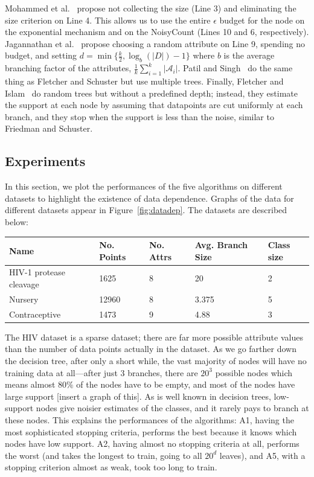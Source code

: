 \documentclass[11pt]{report}
\begin{document}
Mohammed et al.~\cite{Mohammed:2015} propose not collecting the size (Line 3) and eliminating the size criterion on Line 4. This allows us to use the entire $\epsilon$ budget for the node on the exponential mechanism and on the NoisyCount (Lines 10 and 6, respectively). Jagannathan et al.~\cite{Jagannathan:2009} propose choosing a random attribute on Line 9, spending no budget, and setting $d = \min\{\frac{k}{2}, \log_b(|D|)-1\}$ where $b$ is the average branching factor of the attributes, $\frac{1}{k}\sum_{i=1}^k |\mathcal{A}_i|$. Patil and Singh~\cite{Singh:2014} do the same thing as Fletcher and Schuster but use multiple trees. Finally, Fletcher and Islam~\cite{Fletcher:2015} do random trees but without a predefined depth; instead, they estimate the support at each node by assuming that datapoints are cut uniformly at each branch, and they stop when the support is less than the noise, similar to Friedman and Schuster.

\subsection{Experiments}
In this section, we plot the performances of the five algorithms on different datasets to highlight the existence of data dependence. Graphs of the data for different datasets appear in Figure~\ref{fig:datadep}. The datasets are described below:
\begin{tabular}{|p{3cm}|l|l|l|l|}
\hline
Name & No. Points & No. Attrs & Avg. Branch Size & Class size \\ \hline
HIV-1 protease cleavage & 1625 & 8 & 20 & 2 \\ \hline
Nursery & 12960 & 8 & 3.375 & 5 \\ \hline
Contraceptive & 1473 & 9 & 4.88 & 3 \\ \hline
\end{tabular}
The HIV dataset is a sparse dataset; there are far more possible attribute values than the number of data points actually in the dataset. As we go farther down the decision tree, after only a short while, the vast majority of nodes will have no training data at all---after just 3 branches, there are $20^3$ possible nodes which means almost $80\%$ of the nodes have to be empty, and most of the nodes have large support [insert a graph of this]. As is well known in decision trees, low-support nodes give noisier estimates of the classes, and it rarely pays to branch at these nodes. This explains the performances of the algorithms: A1, having the most sophisticated stopping criteria, performs the best because it knows which nodes have low support. A2, having almost no stopping criteria at all, performs the worst (and takes the longest to train, going to all $20^d$ leaves), and A5, with a stopping criterion almost as weak, took too long to train.
\end{document}
